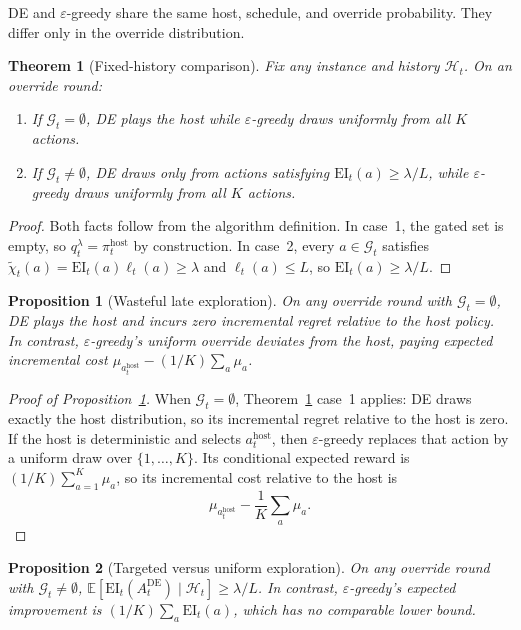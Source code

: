 \documentclass{article}
\newtheorem{theorem} {Theorem}
\newtheorem{proposition} {Proposition}
\newcommand{\Gc}{\mathcal{G}}
\newcommand{\Hc}{\mathcal{H}}
\newcommand{\E}{\mathbb{E}}
\newcommand{\surp}{\ell} %
\newcommand{\delight}{\chi} %
\newcommand{\EI}{\mathrm{EI}} %
\begin{document}
DE and $\varepsilon$-greedy share the same host, schedule, and override probability.
They differ only in the override distribution.

\begin{theorem}[Fixed-history comparison]
\label{thm:coupling}
Fix any instance and history $\Hc_t$.
On an override round:
\begin{enumerate}
\item If $\Gc_t = \emptyset$, DE plays the host while $\varepsilon$-greedy draws uniformly from all $K$ actions.
\item If $\Gc_t \neq \emptyset$, DE draws only from actions satisfying $\EI_t(a) \ge \lambda/L$, while $\varepsilon$-greedy draws uniformly from all $K$ actions.
\end{enumerate}
\end{theorem}

\begin{proof}
Both facts follow from the algorithm definition.
In case~1, the gated set is empty, so $q_t^\lambda = \pi_t^{\mathrm{host}}$ by construction.
In case~2, every $a \in \Gc_t$ satisfies
$\tilde{\delight}_t(a)=\EI_t(a)\surp_t(a)\ge\lambda$
and $\surp_t(a)\le L$, so $\EI_t(a)\ge\lambda/L$.

\end{proof}

\begin{proposition}[Wasteful late exploration]
\label{prop:waste}
On any override round with $\Gc_t = \emptyset$, DE plays the host and incurs zero incremental regret relative to the host policy.
In contrast, $\varepsilon$-greedy's uniform override deviates from the host, paying expected incremental cost $\mu_{a_t^{\mathrm{host}}} - (1/K)\sum_a \mu_a$.
\end{proposition}

\begin{proof}[Proof of Proposition~\ref{prop:waste}]
When $\Gc_t=\emptyset$, Theorem~\ref{thm:coupling} case~1 applies: DE draws exactly the host distribution, so its incremental regret relative to the host is zero.
If the host is deterministic and selects $a_t^{\mathrm{host}}$, then $\varepsilon$-greedy replaces that action by a uniform draw over $\{1,\dots,K\}$.
Its conditional expected reward is $(1/K)\sum_{a=1}^K \mu_a$, so its incremental cost relative to the host is
\[
  \mu_{a_t^{\mathrm{host}}} - \frac{1}{K}\sum_a \mu_a .
\]
\end{proof}

\begin{proposition}[Targeted versus uniform exploration]
\label{prop:targeted}
On any override round with $\Gc_t \neq \emptyset$,
$\E[\EI_t(A_t^{\mathrm{DE}}) \mid \Hc_t] \ge \lambda/L$.
In contrast, $\varepsilon$-greedy's expected improvement is $(1/K)\sum_a \EI_t(a)$, which has no comparable lower bound.
\end{proposition}
\end{document}
